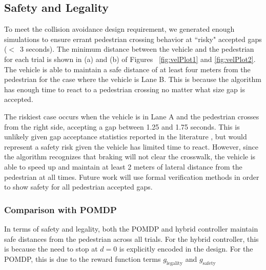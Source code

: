 \documentclass[letterpaper, 10 pt, conference]{ieeeconf} %
\begin{document}
\subsection{Safety and Legality}

To meet the collision avoidance design requirement, we generated enough simulations to ensure errant pedestrian crossing behavior at ``risky" accepted gaps ($<$~3 seconds). The minimum distance between the vehicle and the pedestrian for each trial is shown in (a) and (b) of Figures ~\ref{fig:velPlot1} and \ref{fig:velPlot2}. The vehicle is able to maintain a safe distance of at least four meters from the pedestrian for the case where the vehicle is Lane B. This is because the algorithm has enough time to react to a pedestrian crossing no matter what size gap is accepted. 

The riskiest case occurs when the vehicle is in Lane A and the pedestrian crosses from the right side, accepting a gap between 1.25 and 1.75 seconds. This is unlikely given gap acceptance statistics reported in the literature \cite{Rasouli}\cite{Feliciani2017}, but would represent a safety risk given the vehicle has limited time to react. However, since the algorithm recognizes that braking will not clear the crosswalk, the vehicle is able to speed up and maintain at least 2 meters of lateral distance from the pedestrian at all times. Future work will use formal verification methods in order to show safety for all pedestrian accepted gaps. 


\subsubsection{Comparison with POMDP}

In terms of safety and legality, both the POMDP and hybrid controller maintain safe distances from the pedestrian across all trials. For the hybrid controller, this is because the need to stop at $d=0$ is explicitly encoded in the design. For the POMDP, this is due to the reward function terms $g_\mathrm{legality}$ and $g_\mathrm{safety}$ 
\end{document}
